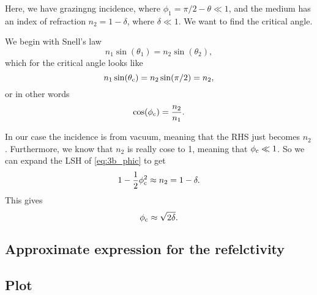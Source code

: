 \documentclass[11pt,letter, swedish, english
]{article}
\begin{document}
Here, we have grazingng incidence, where 
$\phi_1=\pi/2 - \theta\ll1$, and the medium has an index of refraction
$n_2=1-\delta$, where $\delta\ll1$. We want to find the critical angle. 

We begin with Snell's law 
\begin{equation}
n_1\sin(\theta_1) = n_2\sin(\theta_2),
\end{equation}
which for the critical angle looks like
\begin{equation}
n_1\sin(\theta_\text{c}) = n_2\sin(\pi/2) = n_2,
\end{equation}
or in other words
\begin{equation}\label{eq:3b_phic}
\cos(\phi_\text{c}) = \frac{n_2}{n_1}.
\end{equation}

In our case the incidence is from vacuum, meaning that the RHS just
becomes $n_2$. Furthermore, we know that $n_2$ is really cose to 1,
meaning that $\phi_\text{c}\ll1$. So we can expand the LSH of
\eqref{eq:3b_phic} to get
\begin{equation}
1-\frac{1}{2}\phi_\text{c}^2 \approx n_2 = 1-\delta.
\end{equation}
This gives
\begin{equation}
\phi_\text{c} \approx \sqrt{2\delta}.
\end{equation}


\subsection{Approximate expression for the refelctivity}


\subsection{Plot}
\end{document}
